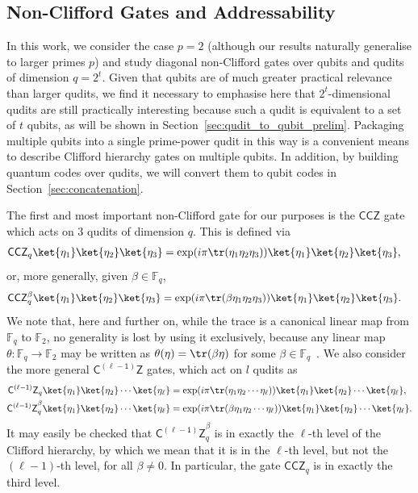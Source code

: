 \documentclass[11pt]{article}
\theoremstyle{definition}
\newcommand{\CCZ}{\mathsf{CCZ}}
\newcommand{\CLZ}{\mathsf{C^{(\ell-1)}Z}}
\begin{document}
\subsection{Non-Clifford Gates and Addressability}\label{sec:prelim_non_clifford_addressability}

In this work, we consider the case $p = 2$ (although our results naturally generalise to larger primes $p$) and study diagonal non-Clifford gates over qubits and qudits of dimension $q=2^t$. Given that qubits are of much greater practical relevance than larger qudits, we find it necessary to emphasise here that $2^t$-dimensional qudits are still practically interesting because such a qudit is equivalent to a set of $t$ qubits, as will be shown in Section~\ref{sec:qudit_to_qubit_prelim}. Packaging multiple qubits into a single prime-power qudit in this way is a convenient means to describe Clifford hierarchy gates on multiple qubits.  In addition, by building quantum codes over qudits, we will convert them to qubit codes in Section~\ref{sec:concatenation}.

The first and most important non-Clifford gate for our purposes is the $\CCZ$ gate which acts on 3 qudits of dimension $q$. This is defined via 
\begin{align}
    \CCZ_q \ket{\eta_1}\ket{\eta_2}\ket{\eta_3} 
    &= \exp(i\pi\tr(\eta_1\eta_2\eta_3))\ket{\eta_1}\ket{\eta_2}\ket{\eta_3},
\end{align}
or, more generally, given $\beta \in \mathbb{F}_q$,
\begin{align}    
    \CCZ_q^\beta \ket{\eta_1}\ket{\eta_2}\ket{\eta_3} 
    &= \exp(i\pi\tr(\beta\eta_1\eta_2\eta_3))\ket{\eta_1}\ket{\eta_2}\ket{\eta_3}.
\end{align}
We note that, here and further on, while the trace is a canonical linear map from $\mathbb{F}_q$ to $\mathbb{F}_2$, no generality is lost by using it exclusively, because any linear map $\theta : \mathbb{F}_q \to \mathbb{F}_2$ may be written as $\theta(\eta) = \tr(\beta\eta)$ for some $\beta \in \mathbb{F}_q$~\cite{Lidl_Niederreiter_1996}.
We also consider the more general $\CLZ$ gates, which act on $l$ qudits as
\begin{align}
    \CLZ_q \ket{\eta_1}\ket{\eta_2}\cdots\ket{\eta_\ell} 
    &= \exp(i\pi\tr(\eta_1\eta_2\cdots \eta_\ell))\ket{\eta_1}\ket{\eta_2}\cdots\ket{\eta_\ell} , \\
    \CLZ_q^\beta \ket{\eta_1}\ket{\eta_2}\cdots\ket{\eta_\ell} 
    &= \exp(i\pi\tr(\beta\eta_1\eta_2\cdots \eta_\ell))\ket{\eta_1}\ket{\eta_2}\cdots\ket{\eta_\ell}.
\end{align}
It may easily be checked that $\CLZ_q^\beta$ is in exactly the $\ell$-th level of the Clifford hierarchy, by which we mean that it is in the $\ell$-th level, but not the $(\ell-1)$-th level, for all $\beta \neq 0$. In particular, the gate $\CCZ_q$ is in exactly the third level.
\end{document}
